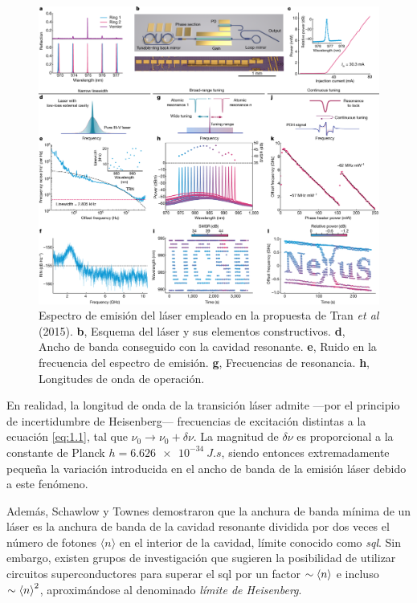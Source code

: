 \begin{figure}[htpb]
  \centering
  \includegraphics[width=\textwidth]{Figuras/ch1_amplif.png}
  \caption{Espectro de emisión del láser empleado en la propuesta de Tran \emph{et al} (2015)\autocite{Tran2022}. \textbf{b}, Esquema del láser y sus elementos constructivos. \textbf{d}, Ancho de banda conseguido con la cavidad resonante. \textbf{e}, Ruido en la frecuencia del espectro de emisión. \textbf{g}, Frecuencias de resonancia. \textbf{h}, Longitudes de onda de operación.}
  \label{fig:ch1_amplif}
\end{figure}

En realidad, la longitud de onda de la transición láser admite ---por el principio de incertidumbre de Heisenberg--- frecuencias de excitación distintas a la ecuación \eqref{eq:1.1}, tal que $\nu_0\rightarrow\nu_0 + \delta\nu$. La magnitud de $\delta\nu$ es proporcional a la constante de Planck $h = \qty{6,626e-34}{J.s}$, siendo entonces extremadamente pequeña la variación introducida en el ancho de banda de la emisión láser debido a este fenómeno. 

Además, Schawlow y Townes demostraron que la anchura de banda mínima de un láser es la anchura de banda de la cavidad resonante dividida por dos veces el número de fotones $\langle n\rangle$ en el interior de la cavidad, límite conocido como \emph{\acrfull{sql}}. Sin embargo, existen grupos de investigación\autocite{Liu2021} que sugieren la posibilidad de utilizar circuitos superconductores para superar el \acrshort{sql} por un factor $\sim \left\langle n\right\rangle$ e incluso $\sim \left\langle n\right\rangle^{2}$, aproximándose al denominado \emph{límite de Heisenberg}.

